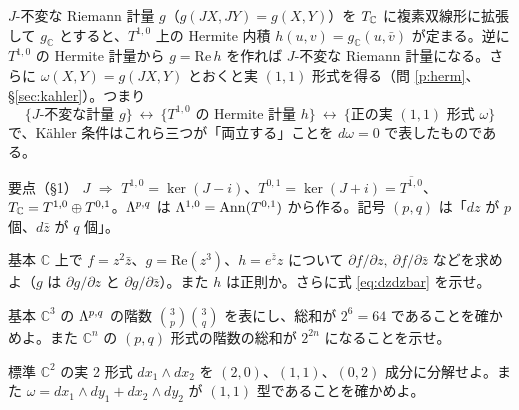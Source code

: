 $J$-不変な Riemann 計量 $g$（$g(JX,JY)=g(X,Y)$）を $T_{\mathbb C}$ に複素双線形に拡張して $g_{\mathbb C}$ とすると、$T^{1,0}$ 上の Hermite 内積 $h(u,v)=g_{\mathbb C}(u,\bar v)$ が定まる。逆に $T^{1,0}$ の Hermite 計量から $g=\mathrm{Re}\,h$ を作れば $J$-不変な Riemann 計量になる。さらに $\omega(X,Y)=g(JX,Y)$ とおくと実 $(1,1)$ 形式を得る（問 \ref{p:herm}、§\ref{sec:kahler}）。つまり
\[
\{J\text{-不変な計量 }g\}\ \longleftrightarrow\ \{T^{1,0}\text{ の Hermite 計量 }h\}\ \longleftrightarrow\ \{\text{正の実 }(1,1)\text{ 形式 }\omega\}
\]
で、Kähler 条件はこれら三つが「両立する」ことを $d\omega=0$ で表したものである。

\begin{center}
\end{center}

\begin{keybox}{要点（§1）}
$J$ $\Rightarrow$ $T^{1,0}=\ker(J-i)$、$T^{0,1}=\ker(J+i)=\overline{T^{1,0}}$、$T_{\mathbb C}=T^{1,0}\oplus T^{0,1}$。$\Lambda^{p,q}$ は $\Lambda^{1,0}=\mathrm{Ann}(T^{0,1})$ から作る。記号 $(p,q)$ は「$dz$ が $p$ 個、$d\bar z$ が $q$ 個」。
\end{keybox}

\begin{prob}{基本}\label{p:wirt}
$\mathbb C$ 上で $f=z^2\bar z$、$g=\mathrm{Re}(z^3)$、$h=e^{\bar z}z$ について $\partial f/\partial z,\ \partial f/\partial\bar z$ などを求めよ（$g$ は $\partial g/\partial z$ と $\partial g/\partial\bar z$）。また $h$ は正則か。さらに式 \eqref{eq:dzdzbar} を示せ。
\end{prob}
\begin{prob}{基本}\label{p:count}
$\mathbb C^3$ の $\Lambda^{p,q}$ の階数 $\binom3p\binom3q$ を表にし、総和が $2^6=64$ であることを確かめよ。また $\mathbb C^n$ の $(p,q)$ 形式の階数の総和が $2^{2n}$ になることを示せ。
\end{prob}
\begin{prob}{標準}\label{p:decomp}
$\mathbb C^2$ の実 2 形式 $dx_1\wedge dx_2$ を $(2,0)$、$(1,1)$、$(0,2)$ 成分に分解せよ。また $\omega=dx_1\wedge dy_1+dx_2\wedge dy_2$ が $(1,1)$ 型であることを確かめよ。
\end{prob}

